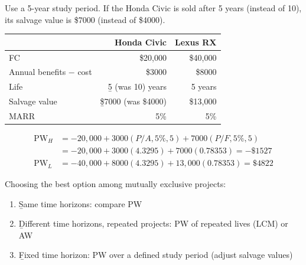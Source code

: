 \begin{example}
    Use a 5-year study period. If the Honda Civic is sold after 5 years
    (instead of 10), its salvage value is \$7000 (instead of \$4000).
    \begin{center}
    \begin{tabular}{lrr}
        \toprule
        & Honda Civic & Lexus RX \\
        \midrule
        FC & \$20,000 & \$40,000 \\
        Annual benefits $-$ cost & \$3000 & \$8000 \\
        Life & \b{5} (was 10) years & 5 years \\
        Salvage value & \b{\$7000} (was \$4000) & \$13,000 \\
        MARR & 5\% & 5\% \\
        \bottomrule
    \end{tabular}
    \end{center}
    \begin{align*}
        \text{PW}_H &= -20{,}000 + 3000(P/A,5\%,5) + 7000(P/F,5\%,5)\\
        &= -20{,}000 + 3000(4.3295) + 7000(0.78353) = -\$1527\\
        \text{PW}_L &= -40{,}000 + 8000(4.3295) + 13{,}000(0.78353) = \$4822
    \end{align*}
\end{example}

Choosing the best option among mutually exclusive projects:
\begin{enumerate}
    \item \b{Same time horizons}: compare PW
    \item \b{Different time horizons, repeated projects}: PW of repeated lives (LCM) or AW
    \item \b{Fixed time horizon}: PW over a defined study period (adjust salvage values)
\end{enumerate}

